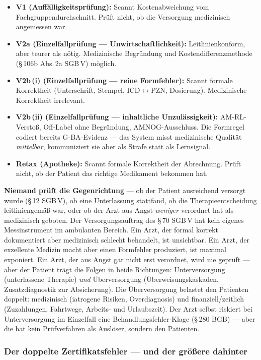 \documentclass{umbruch-position}
\begin{document}
\begin{itemize}[nosep]
  \item \textbf{V1 (Auffälligkeitsprüfung):} Scannt Kostenabweichung vom Fachgruppendurchschnitt. Prüft nicht, ob die Versorgung medizinisch angemessen war.
  \item \textbf{V2a (Einzelfallprüfung --- Unwirtschaftlichkeit):} Leitlinienkonform, aber teurer als nötig. Medizinische Begründung und Kostendifferenzmethode (\S\,106b Abs.\,2a SGB\,V) möglich.
  \item \textbf{V2b\,(i) (Einzelfallprüfung --- reine Formfehler):} Scannt formale Korrektheit (Unterschrift, Stempel, ICD$\leftrightarrow$PZN, Dosierung). Medizinische Korrektheit irrelevant.
  \item \textbf{V2b\,(ii) (Einzelfallprüfung --- inhaltliche Unzulässigkeit):} AM-RL-Verstoß, Off-Label ohne Begründung, AMNOG-Ausschluss. Die Formregel codiert bereits G-BA-Evidenz --- das System misst medizinische Qualität \textit{mittelbar}, kommuniziert sie aber als Strafe statt als Lernsignal.
  \item \textbf{Retax (Apotheke):} Scannt formale Korrektheit der Abrechnung. Prüft nicht, ob der Patient das richtige Medikament bekommen hat.
\end{itemize}

\textbf{Niemand prüft die Gegenrichtung} --- ob der Patient ausreichend versorgt wurde (\S\,12 SGB\,V), ob eine Unterlassung stattfand, ob die Therapieentscheidung leitliniengemäß war, oder ob der Arzt aus Angst \textit{weniger} verordnet hat als medizinisch geboten. Der Versorgungsauftrag des \S\,70 SGB\,V hat kein eigenes Messinstrument im ambulanten Bereich. Ein Arzt, der formal korrekt dokumentiert aber medizinisch schlecht behandelt, ist unsichtbar. Ein Arzt, der exzellente Medizin macht aber einen Formfehler produziert, ist maximal exponiert. Ein Arzt, der aus Angst gar nicht erst verordnet, wird nie geprüft --- aber der Patient trägt die Folgen in beide Richtungen: Unterversorgung (unterlassene Therapie) \emph{und} Überversorgung (Überweisungskaskaden, Zusatzdiagnostik zur Absicherung). Die Überversorgung belastet den Patienten doppelt: medizinisch (iatrogene Risiken, Overdiagnosis) und finanziell/zeitlich (Zuzahlungen, Fahrtwege, Arbeits- und Urlaubszeit). Der Arzt selbst riskiert bei Unterversorgung im Einzelfall eine Behandlungsfehler-Klage (\S\,280 BGB) --- aber die hat kein Prüfverfahren als Auslöser, sondern den Patienten.

\subsubsection{Der doppelte Zertifikatsfehler --- und der größere dahinter}
\end{document}
